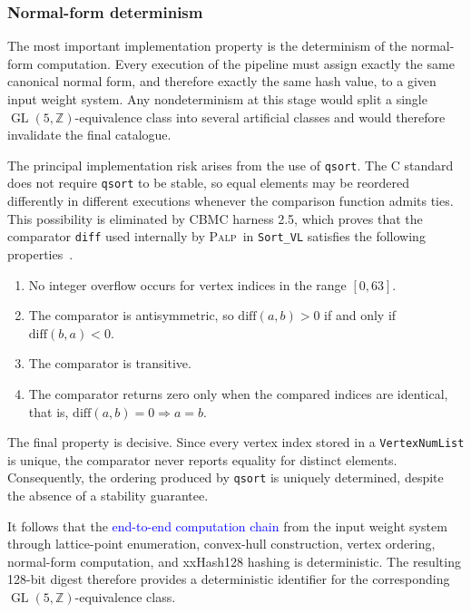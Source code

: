 \documentclass[appliedmath,article,submit,moreauthors]{Definitions/mdpi}
\newcommand{\GL}{\operatorname{GL}}
\newcommand{\PALP}{\textsc{Palp}}
\begin{document}
\subsubsection{Normal-form determinism}
\label{sec:verification-nf-determinism}

The most important implementation property is the determinism of the normal-form
computation. Every execution of the pipeline must assign exactly the same
canonical normal form, and therefore exactly the same hash value, to a given
input weight system. Any nondeterminism at this stage would split a single
\(\GL(5,\mathbb Z)\)-equivalence class into several artificial classes and would
therefore invalidate the final catalogue.

The principal implementation risk arises from the use of \nolinkurl{qsort}. The
C standard does not require \nolinkurl{qsort} to be stable, so equal elements
may be reordered differently in different executions whenever the comparison
function admits ties. This possibility is eliminated by CBMC harness 2.5, which
proves that the comparator \nolinkurl{diff} used internally by \PALP\ in
\nolinkurl{Sort\_VL} satisfies the following properties~\cite{PALP,CBMC}.

\begin{enumerate}
\item No integer overflow occurs for vertex indices in the range \([0,63]\).

\item The comparator is antisymmetric, so \(\mathrm{diff}(a,b)>0\) if and only
if \(\mathrm{diff}(b,a)<0\).

\item The comparator is transitive.

\item The comparator returns zero only when the compared indices are identical,
that is, \(\mathrm{diff}(a,b)=0\Rightarrow a=b\).
\end{enumerate}

The final property is decisive. Since every vertex index stored in a
\nolinkurl{VertexNumList} is unique, the comparator never reports equality for
distinct elements. Consequently, the ordering produced by \nolinkurl{qsort} is
uniquely determined, despite the absence of a stability guarantee.

It follows that the \textcolor{blue}{end-to-end computation chain} from the input weight system
through lattice-point enumeration, convex-hull construction, vertex ordering,
normal-form computation, and xxHash128 hashing is deterministic. The resulting
128-bit digest therefore provides a deterministic identifier for the
corresponding \(\GL(5,\mathbb Z)\)-equivalence class.
\end{document}
